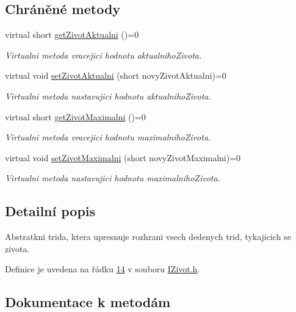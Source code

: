 \subsection*{Chráněné metody}
\begin{DoxyCompactItemize}
\item 
virtual short \hyperlink{classIceAge_1_1IZivot_aac99c9db4859e3f17f0334fa6db93933}{get\+Zivot\+Aktualni} ()=0
\begin{DoxyCompactList}\small\item\em Virtualni metoda vracejici hodnotu aktualniho\+Zivota. \end{DoxyCompactList}\item 
virtual void \hyperlink{classIceAge_1_1IZivot_ab5dd4fbf3c05f15fe732e644ce0a15be}{set\+Zivot\+Aktualni} (short novy\+Zivot\+Aktualni)=0
\begin{DoxyCompactList}\small\item\em Virtualni metoda nastavujici hodnotu aktualniho\+Zivota. \end{DoxyCompactList}\item 
virtual short \hyperlink{classIceAge_1_1IZivot_ab5b8c647c30c5f325ddd6066220e1fc9}{get\+Zivot\+Maximalni} ()=0
\begin{DoxyCompactList}\small\item\em Virtualni metoda vracejici hodnotu maximalniho\+Zivota. \end{DoxyCompactList}\item 
virtual void \hyperlink{classIceAge_1_1IZivot_aab09686c086958de400579d031d4ed8e}{set\+Zivot\+Maximalni} (short novy\+Zivot\+Maximalni)=0
\begin{DoxyCompactList}\small\item\em Virtualni metoda nastavujici hodnotu maximalniho\+Zivota. \end{DoxyCompactList}\end{DoxyCompactItemize}


\subsection{Detailní popis}
Abstratkni trida, ktera upresnuje rozhrani vsech dedenych trid, tykajicich se zivota. 

Definice je uvedena na řádku \hyperlink{IZivot_8h_source_l00014}{14} v souboru \hyperlink{IZivot_8h_source}{I\+Zivot.\+h}.



\subsection{Dokumentace k metodám}
